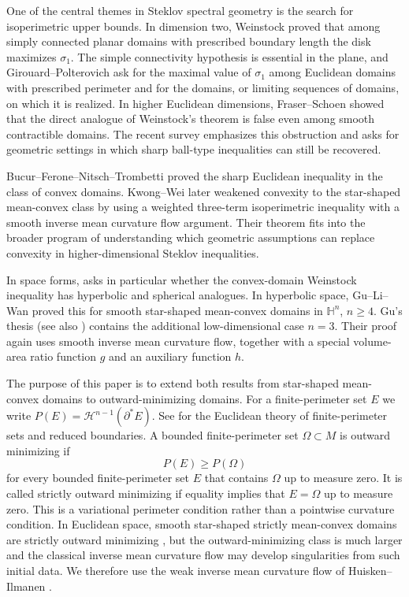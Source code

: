 \documentclass[10pt,a4paper]{amsart}
\numberwithin{equation}{section}
\newcommand{\calH}{\mathcal H}
\newcommand{\HH}{\mathbb H}
\begin{document}
One of the central themes in Steklov spectral geometry is the search for isoperimetric upper bounds.  In dimension two, Weinstock \cite{W1954} proved that among simply connected planar domains with prescribed boundary length the disk maximizes $\sigma_1$.  The simple connectivity hypothesis is essential in the plane, and Girouard--Polterovich  \cite[Open Problem~2]{GP2017} ask for the maximal value of $\sigma_1$ among Euclidean domains with prescribed perimeter and for the domains, or limiting sequences of domains, on which it is realized.  In higher Euclidean dimensions, Fraser--Schoen  \cite{FS2019} showed that the direct analogue of Weinstock's theorem is false even among smooth contractible domains.  The recent survey \cite[Section~4]{CGGS24} emphasizes this obstruction and asks for geometric settings in which sharp ball-type inequalities can still be recovered.

Bucur--Ferone--Nitsch--Trombetti \cite{BFNT2021} proved the sharp Euclidean inequality in the class of convex domains.  Kwong--Wei \cite{KwongWei2023} later weakened convexity to the star-shaped mean-convex class by using a weighted three-term isoperimetric inequality \cite{GR2020} with a smooth inverse mean curvature flow argument.  Their theorem fits into the broader program of understanding which geometric assumptions can replace convexity in higher-dimensional Steklov inequalities.  

In space forms, \cite[Open Question~4.27]{CGGS24} asks in particular whether the convex-domain Weinstock inequality has hyperbolic and spherical analogues.  In hyperbolic space, Gu--Li--Wan \cite{GuLiWan2025} proved this for smooth star-shaped mean-convex domains in $\HH^n$, $n\geq4$.  Gu's thesis \cite{GuThesis2026} (see also \cite{GLW26}) contains the additional low-dimensional case $n=3$.  Their proof again uses smooth inverse mean curvature flow, together with a special volume-area ratio function $g$ and an auxiliary function $h$.

The purpose of this paper is to extend both results \cite{KwongWei2023,GuLiWan2025,GuThesis2026} from star-shaped mean-convex domains to outward-minimizing domains.  For a finite-perimeter set $E$ we write $P(E)=\calH^{n-1}(\partial^*E)$.  See \cite[Chapters~12 and~15]{Maggi2012} for the Euclidean theory of finite-perimeter sets and reduced boundaries.  A bounded finite-perimeter set $\Omega\subset M$ is outward minimizing if
\begin{equation*}
    P(E)\geq P(\Omega)
\end{equation*}
for every bounded finite-perimeter set $E$ that contains $\Omega$ up to measure zero.  It is called strictly outward minimizing if equality implies that $E=\Omega$ up to measure zero.  This is a variational perimeter condition rather than a pointwise curvature condition.  In Euclidean space, smooth star-shaped strictly mean-convex domains are strictly outward minimizing \cite[Corollary~3.8]{FM22}, but the outward-minimizing class is much larger and the classical inverse mean curvature flow may develop singularities from such initial data.  We therefore use the weak inverse mean curvature flow of Huisken--Ilmanen \cite{HI2001}.  
\end{document}

